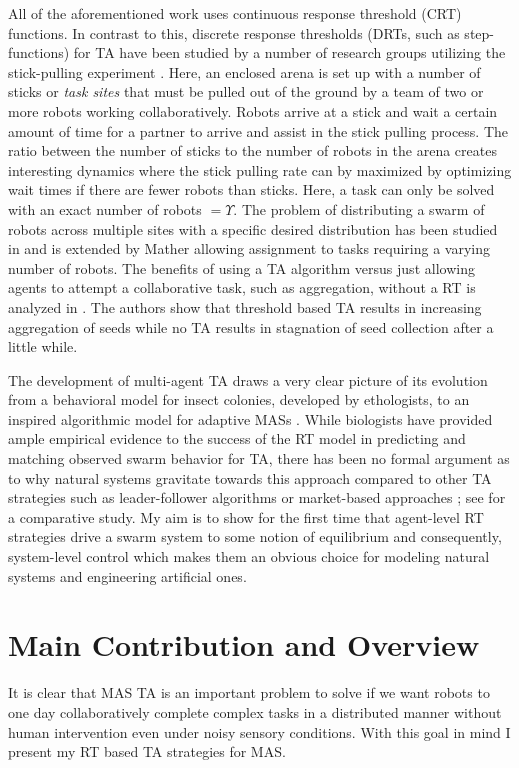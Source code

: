 \documentclass[defaultstyle,12pt]{thesis}
\newcommand{\td}{\Upsilon}   %
\begin{document}
All of the aforementioned work uses continuous response threshold (CRT) functions. In contrast to this, discrete response thresholds (DRTs, such as step-functions) for TA have been studied by a number of research groups utilizing the stick-pulling experiment \cite{Martinoli1995, Martinoli1998, Lerman2001, Martinoli2004}. Here, an enclosed arena is set up with a number of sticks or \emph{task sites} that must be pulled out of the ground by a team of two or more robots working collaboratively. Robots arrive at a stick and wait a certain amount of time for a partner to arrive and assist in the stick pulling process. The ratio between the number of sticks to the number of robots in the arena creates interesting dynamics where the stick pulling rate can by maximized by optimizing wait times if there are fewer robots than sticks. Here, a task can only be solved with an exact number of robots $= \td$. The problem of distributing a swarm of robots across multiple sites with a specific desired distribution has been studied in \cite{Berman2009, Correll2008} and is extended by Mather \cite{Mather2010} allowing assignment to tasks requiring a varying number of robots. The benefits of using a TA algorithm versus just allowing agents to attempt a collaborative task, such as aggregation, without a RT is analyzed in \cite{Agassounon2001}. The authors show that threshold based TA results in increasing aggregation of seeds while no TA results in stagnation of seed collection after a little while. 

The development of multi-agent TA draws a very clear picture of its evolution from a behavioral model for insect colonies, developed by ethologists, to an inspired algorithmic model for adaptive MASs \cite{Krieger2000}. While biologists have provided ample empirical evidence to the success of the RT model in predicting and matching observed swarm behavior for TA, there has been no formal argument as to why natural systems gravitate towards this approach compared to other TA strategies such as leader-follower algorithms \cite{Chen2011} or market-based approaches \cite{Amstutz2008,Vig2007}; see \cite{Kalra2006} for a comparative study. My aim is to show for the first time that agent-level RT strategies drive a swarm system to some notion of equilibrium and consequently, system-level control which makes them an obvious choice for modeling natural systems and engineering artificial ones.

\section{Main Contribution and Overview}
It is clear that MAS TA is an important problem to solve if we want robots to one day collaboratively complete complex tasks in a distributed manner without human intervention even under noisy sensory conditions. With this goal in mind I present my RT based TA strategies for MAS.
\end{document}
